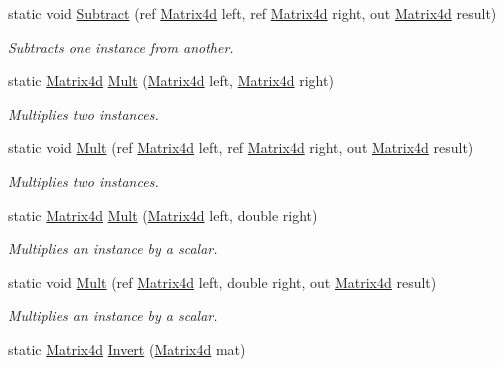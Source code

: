\begin{DoxyCompactItemize}
static void \hyperlink{struct_open_t_k_1_1_matrix4d_a64fe9f23981c8bbb128ccfbc07307015}{Subtract} (ref \hyperlink{struct_open_t_k_1_1_matrix4d}{Matrix4d} left, ref \hyperlink{struct_open_t_k_1_1_matrix4d}{Matrix4d} right, out \hyperlink{struct_open_t_k_1_1_matrix4d}{Matrix4d} result)
\begin{DoxyCompactList}\small\item\em Subtracts one instance from another. \end{DoxyCompactList}\item 
static \hyperlink{struct_open_t_k_1_1_matrix4d}{Matrix4d} \hyperlink{struct_open_t_k_1_1_matrix4d_aca668fbd57da4837359c4c83f59c125c}{Mult} (\hyperlink{struct_open_t_k_1_1_matrix4d}{Matrix4d} left, \hyperlink{struct_open_t_k_1_1_matrix4d}{Matrix4d} right)
\begin{DoxyCompactList}\small\item\em Multiplies two instances. \end{DoxyCompactList}\item 
static void \hyperlink{struct_open_t_k_1_1_matrix4d_a4bc18a3699ef4e1d2156be579b148a19}{Mult} (ref \hyperlink{struct_open_t_k_1_1_matrix4d}{Matrix4d} left, ref \hyperlink{struct_open_t_k_1_1_matrix4d}{Matrix4d} right, out \hyperlink{struct_open_t_k_1_1_matrix4d}{Matrix4d} result)
\begin{DoxyCompactList}\small\item\em Multiplies two instances. \end{DoxyCompactList}\item 
static \hyperlink{struct_open_t_k_1_1_matrix4d}{Matrix4d} \hyperlink{struct_open_t_k_1_1_matrix4d_ae6a7e9aea96389c3ed94a2164142a72e}{Mult} (\hyperlink{struct_open_t_k_1_1_matrix4d}{Matrix4d} left, double right)
\begin{DoxyCompactList}\small\item\em Multiplies an instance by a scalar. \end{DoxyCompactList}\item 
static void \hyperlink{struct_open_t_k_1_1_matrix4d_a69ff229738db84b2a95301844b36617b}{Mult} (ref \hyperlink{struct_open_t_k_1_1_matrix4d}{Matrix4d} left, double right, out \hyperlink{struct_open_t_k_1_1_matrix4d}{Matrix4d} result)
\begin{DoxyCompactList}\small\item\em Multiplies an instance by a scalar. \end{DoxyCompactList}\item 
static \hyperlink{struct_open_t_k_1_1_matrix4d}{Matrix4d} \hyperlink{struct_open_t_k_1_1_matrix4d_a4a83df0190f354e2054448bcf91edd5f}{Invert} (\hyperlink{struct_open_t_k_1_1_matrix4d}{Matrix4d} mat)

\end{DoxyCompactItemize}
